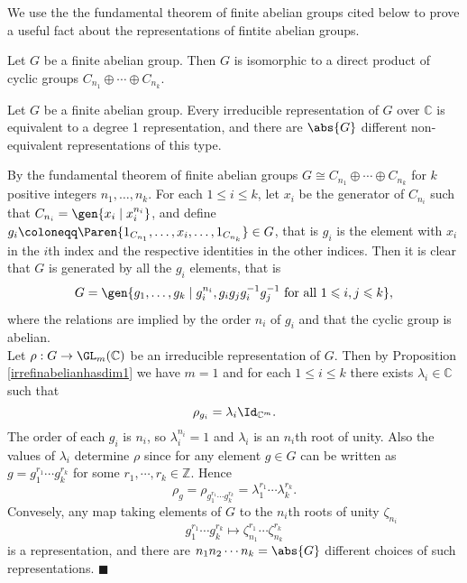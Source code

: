 \documentclass[../Project.tex]{subfiles}
\begin{document}
We use the the fundamental theorem of finite abelian groups cited below to prove a useful fact about the representations of fintite abelian groups.
\begin{theo}
	\label{funtheoabelian}
	Let $G$ be a finite abelian group. Then $G$ is isomorphic to a direct product of cyclic groups $C_{n_1} \oplus \cdots \oplus C_{n_k}$.
\end{theo}


\begin{theo}[{\cite[Theorem 9.8]{2}}]
	\label{representationoffinabelian}
	Let $G$ be a finite abelian group. Every irreducible representation of $G$ over $\mathbb{C}$ is equivalent to a degree 1 representation, and there are $\abs{G}$ different non-equivalent representations of this type.
\end{theo}
\begin{proo*}[{\cite[page 81]{2}}]
		By the fundamental theorem of finite abelian groups $G \cong C_{n_1}\oplus\cdots\oplus C_{n_k}$ for $k$ positive integers $n_1,\dots,n_k$. 
		For each $1 \leqslant i \leqslant k$, let $x_i$ be the generator of $C_{n_i}$ such that $C_{n_i} = \gen{x_i\;\vert\;x_i^{n_i}}$, and define $g_i \coloneqq  \Paren{1_{C_{n_1}},\dots,x_i,\dots,1_{C_{n_k}}} \in G$, that is $g_i$ is the element with $x_i$ in the $i$th index and the respective identities in the other indices. Then it is clear that $G$ is generated by all the $g_i$ elements, that is
	$$G = \gen{g_1,\dots,g_k\;\vert\;g_i^{n_i},g_ig_jg_i^{-1}g_j^{-1} \text{ for all } 1 \leqslant i,j \leqslant k},$$
	where the relations are implied by the order $n_i$ of $g_i$ and that the cyclic group is abelian.\\

	Let $\rho : G \to \GL_m(\mathbb{C})$ be an irreducible representation of $G$. Then by Proposition \ref{irrefinabelianhasdim1} we have $m = 1$ and for each $1 \leqslant i \leqslant k$ there exists $\lambda_i \in \mathbb{C}$ such that
	$$\rho_{g_i} = \lambda_i\Id_{\mathbb{C}^m}.$$
	The order of each $g_i$ is $n_i$, so $\lambda_i^{n_i} = 1$ and $\lambda_i$ is an $n_i$th root of unity. Also the values of $\lambda_i$ determine $\rho$ since for any element $g \in G$ can be written as $g = g_1^{r_1}\cdots g_k^{r_k}$ for some $r_1,\cdots,r_k \in \mathbb{Z}$. Hence
	$$\rho_g = \rho_{g_1^{r_1}\cdots g_k^{r_k}} = \lambda_1^{r_1}\cdots\lambda_k^{r_k}.$$
	Convesely, any map taking elements of $G$ to the $n_i$th roots of unity $\zeta_{n_i}$ $$g_1^{r_1}\cdots g_k^{r_k} \mapsto \zeta_{n_1}^{r_1}\cdots\zeta_{n_k}^{r_k}$$
	is a representation, and there are $n_1n_2\cdots n_k = \abs{G}$ different choices of such representations. \hfill$\blacksquare$\\
\end{proo*}
\end{document}
